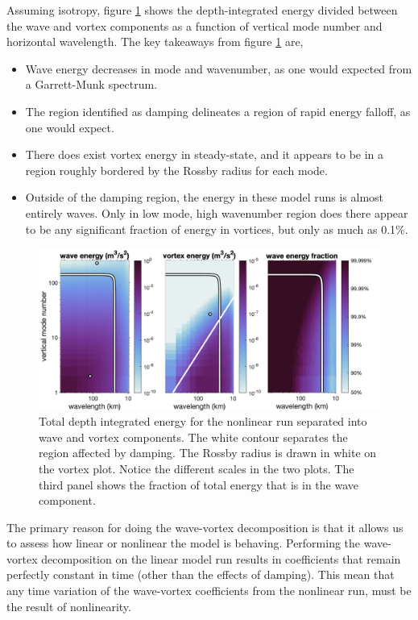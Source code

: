 \documentclass[10pt]{article}
\begin{document}
Assuming isotropy, figure \ref{Energy-nonlinear} shows the depth-integrated energy divided between the wave and vortex components as a function of vertical mode number and horizontal wavelength. The key takeaways from figure \ref{Energy-nonlinear} are,
\begin{itemize}
    \item Wave energy decreases in mode and wavenumber, as one would expected from a Garrett-Munk spectrum.
    \item The region identified as damping delineates a region of rapid energy falloff, as one would expect.
    \item There does exist vortex energy in steady-state, and it appears to be in a region roughly bordered by the Rossby radius for each mode.
    \item Outside of the damping region, the energy in these model runs is almost entirely waves. Only in low mode, high wavenumber region does there appear to be any significant fraction of energy in vortices, but only as much as 0.1\%.
\end{itemize}

\begin{figure}[t]
  \centerline{\includegraphics[width=39pc,angle=0]{figures/EnergyAndEnergyFraction-nonlinear}}
  \caption{Total depth integrated energy for the nonlinear run separated into wave and vortex components. The white contour separates the region affected by damping. The Rossby radius is drawn in white on the vortex plot. Notice the different scales in the two plots. The third panel shows the fraction of total energy that is in the wave component.}
  \label{Energy-nonlinear}
\end{figure}

The primary reason for doing the wave-vortex decomposition is that it allows us to assess how linear or nonlinear the model is behaving. Performing the wave-vortex decomposition on the linear model run results in coefficients that remain perfectly constant in time (other than the effects of damping). This mean that any time variation of the wave-vortex coefficients from the nonlinear run, must be the result of nonlinearity.
\end{document}
